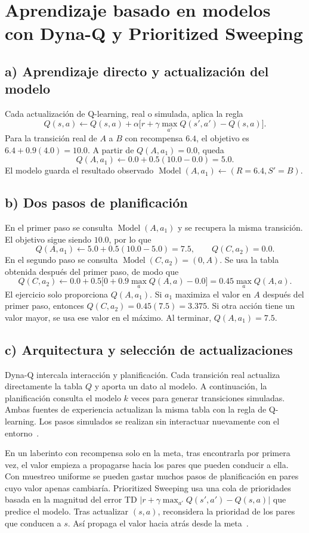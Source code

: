 \section{Aprendizaje basado en modelos con Dyna-Q y Prioritized Sweeping}

\subsection*{a) Aprendizaje directo y actualización del modelo}

Cada actualización de Q-learning, real o simulada, aplica la regla
\[
    Q(s,a)\leftarrow Q(s,a)
    +\alpha\bigl[r+\gamma\max_{a'}Q(s',a')-Q(s,a)\bigr].
\]
Para la transición real de $A$ a $B$ con recompensa $6.4$, el objetivo es
$6.4+0.9(4.0)=10.0$. A partir de $Q(A,a_1)=0.0$, queda
\[
    Q(A,a_1)\leftarrow 0.0+0.5(10.0-0.0)=\boxed{5.0}.
\]
El modelo guarda el resultado observado
$\operatorname{Model}(A,a_1)\leftarrow (R=6.4,S'=B)$.

\subsection*{b) Dos pasos de planificación}

En el primer paso se consulta $\operatorname{Model}(A,a_1)$ y se recupera
la misma transición.
El objetivo sigue siendo $10.0$, por lo que
\[
    Q(A,a_1)\leftarrow 5.0+0.5(10.0-5.0)=\boxed{7.5},
    \qquad Q(C,a_2)=0.0.
\]
En el segundo paso se consulta $\operatorname{Model}(C,a_2)=(0,A)$.
Se usa la tabla obtenida después del primer paso, de modo que
\[
    Q(C,a_2)\leftarrow 0.0+0.5\bigl[0+0.9\max_a Q(A,a)-0.0\bigr]
    =0.45\max_a Q(A,a).
\]
El ejercicio solo proporciona $Q(A,a_1)$. Si $a_1$ maximiza el valor en
$A$ después del primer paso, entonces
$Q(C,a_2)=0.45(7.5)=\boxed{3.375}$. Si otra acción tiene un valor mayor,
se usa ese valor en el máximo. Al terminar, $Q(A,a_1)=7.5$.

\subsection*{c) Arquitectura y selección de actualizaciones}

Dyna-Q intercala interacción y planificación. Cada transición real
actualiza directamente la tabla $Q$ y aporta un dato al modelo. A
continuación, la planificación consulta el modelo $k$ veces para generar
transiciones simuladas. Ambas fuentes de experiencia actualizan la misma
tabla con la regla de Q-learning. Los pasos simulados se realizan sin
interactuar nuevamente con el entorno~\cite[seccs.~8.1--8.3]{sutton}.

En un laberinto con recompensa solo en la meta, tras encontrarla por
primera vez, el valor empieza a propagarse hacia los pares que pueden
conducir a ella. Con muestreo uniforme se pueden gastar muchos pasos de
planificación en pares cuyo valor apenas cambiaría. Prioritized Sweeping
usa una cola de prioridades basada en la magnitud del error TD
$\lvert r+\gamma\max_{a'}Q(s',a')-Q(s,a)\rvert$ que predice el modelo.
Tras actualizar $(s,a)$, reconsidera la prioridad de los pares que
conducen a $s$. Así propaga el valor hacia atrás desde la
meta~\cite[secc.~8.4]{sutton}.
